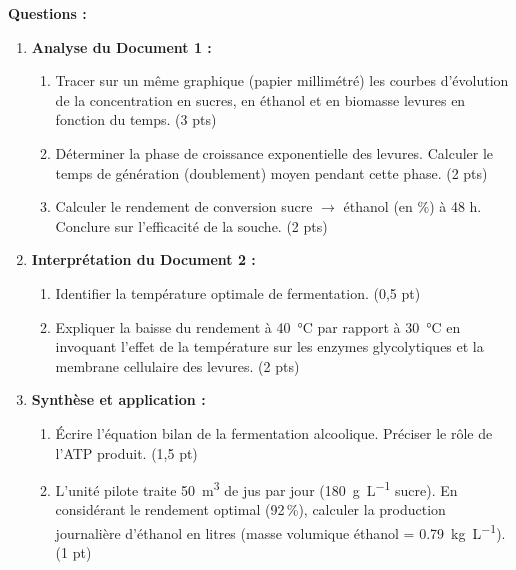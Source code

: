 \documentclass[11pt]{article}
\begin{document}
\begin{exercice}
\textbf{Questions :}
\begin{enumerate}
\item \textbf{Analyse du Document 1 :}
\begin{enumerate}
\item Tracer sur un même graphique (papier millimétré) les courbes d'évolution de la concentration en sucres, en éthanol et en biomasse levures en fonction du temps. (3 pts)
\item Déterminer la phase de croissance exponentielle des levures. Calculer le temps de génération (doublement) moyen pendant cette phase. (2 pts)
\item Calculer le rendement de conversion sucre $\rightarrow$ éthanol (en \%) à 48 h. Conclure sur l'efficacité de la souche. (2 pts)
\end{enumerate}
\item \textbf{Interprétation du Document 2 :}
\begin{enumerate}
\item Identifier la température optimale de fermentation. (0,5 pt)
\item Expliquer la baisse du rendement à \SI{40}{\celsius} par rapport à \SI{30}{\celsius} en invoquant l'effet de la température sur les enzymes glycolytiques et la membrane cellulaire des levures. (2 pts)
\end{enumerate}
\item \textbf{Synthèse et application :}
\begin{enumerate}
\item Écrire l'équation bilan de la fermentation alcoolique. Préciser le rôle de l'ATP produit. (1,5 pt)
\item L'unité pilote traite \SI{50}{\cubic\meter} de jus par jour (\SI{180}{\gram\per\liter} sucre). En considérant le rendement optimal (92\,\%), calculer la production journalière d'éthanol en litres (masse volumique éthanol = \SI{0,79}{\kg\per\liter}). (1 pt)
\end{enumerate}
\end{enumerate}
\end{exercice}
\end{document}
